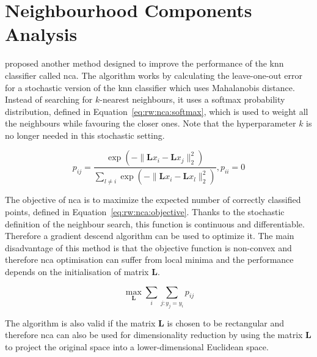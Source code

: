 \section{Neighbourhood Components Analysis} \label{chap:rw:nca}
\citep{jacobgoldberger2004neighbourhood} proposed another method designed to improve the performance of the \ac{knn} classifier called \acf{nca}. The algorithm works by calculating the leave-one-out error for a stochastic version of the \ac{knn} classifier which uses Mahalanobis distance. Instead of searching for $k$-nearest neighbours, it uses a softmax probability distribution, defined in Equation~\ref{eq:rw:nca:softmax}, which is used to weight all the neighbours while favouring the closer ones. Note that the hyperparameter $k$ is no longer needed in this stochastic setting.

\begin{equation}
p_{ij} = \frac{ \exp(-\lVert \bm{L}x_i-\bm{L}x_j \rVert_2^2) }{ \sum_{l \neq i} \exp(-\lVert \bm{L}x_i-\bm{L}x_l \rVert_2^2) }, p_{ii}=0 \label{eq:rw:nca:softmax}
\end{equation}

The objective of \ac{nca} is to maximize the expected number of correctly classified points, defined in Equation~\ref{eq:rw:nca:objective}. Thanks to the stochastic definition of the neighbour search, this function is continuous and differentiable. Therefore a gradient descend algorithm can be used to optimize it. The main disadvantage of this method is that the objective function is non-convex and therefore \ac{nca} optimisation can suffer from local minima and the performance depends on the initialisation of matrix $\bm{L}$. 

\begin{equation}
\max_{\bm{L}} \sum_i \sum_{j:y_j=y_i} p_{ij} \label{eq:rw:nca:objective}
\end{equation}

The algorithm is also valid if the matrix $\bm{L}$ is chosen to be rectangular and therefore \ac{nca} can also be used for dimensionality reduction by using the matrix $\bm{L}$ to project the original space into a lower-dimensional Euclidean space.


